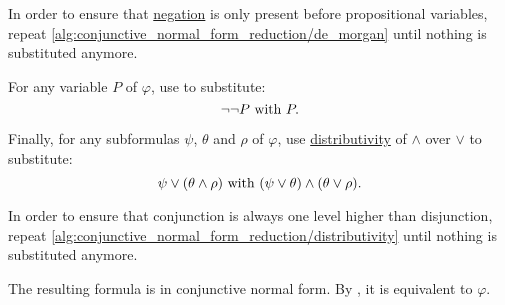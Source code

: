 \begin{algorithm}
\begin{AlgEnum}
    In order to ensure that \hyperref[def:propositional_alphabet/negation]{negation} is only present before propositional variables, repeat \ref{alg:conjunctive_normal_form_reduction/de_morgan} until nothing is substituted anymore.

     For any variable \( P \) of \( \varphi \), use  to substitute:
    \begin{equation*}
      \neg \neg P \text{ with } P.
    \end{equation*}

     Finally, for any subformulas \( \psi \), \( \theta \) and \( \rho \) of \( \varphi \), use \hyperref[eq:def:distributive_lattice/distributivity]{distributivity} of \( \wedge \) over \( \vee \) to substitute:
    \begin{equation*}
      \psi \vee (\theta \wedge \rho) \text{ with } (\psi \vee \theta) \wedge (\theta \vee \rho).
    \end{equation*}

    In order to ensure that conjunction is always one level higher than disjunction, repeat \ref{alg:conjunctive_normal_form_reduction/distributivity} until nothing is substituted anymore.
  \end{AlgEnum}

  The resulting formula is in conjunctive normal form. By , it is equivalent to \( \varphi \).
\end{algorithm}

